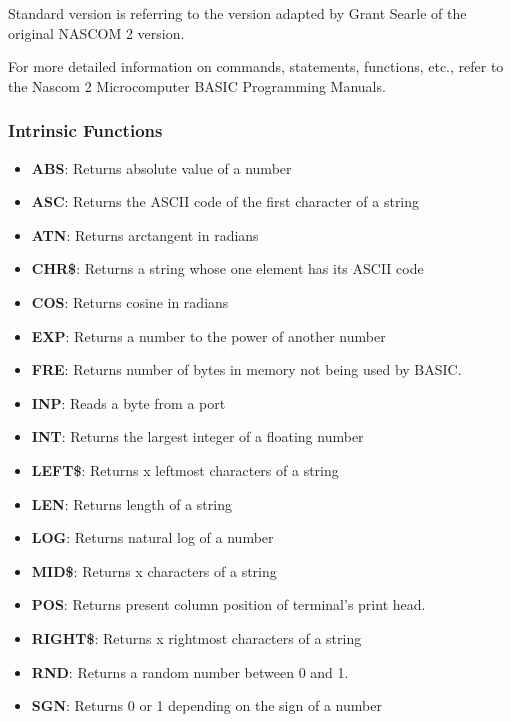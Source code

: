 \documentclass[a4paper,11pt]{article}
\begin{document}
    Standard version is referring to the version adapted by Grant Searle
    \cite{searle1} of the original NASCOM 2 version.

    For more detailed information on commands, statements, functions, etc.,
    refer to the Nascom 2 Microcomputer BASIC Programming Manuals\cite{nascombasic}.

    \subsubsection{Intrinsic Functions}

    \begin{itemize}
        \item \textbf{ABS}: Returns absolute value of a number
        \item \textbf{ASC}: Returns the ASCII code of the first character of a string
        \item \textbf{ATN}: Returns arctangent in radians
        \item \textbf{CHR\$}: Returns a string whose one element has its ASCII code
        \item \textbf{COS}: Returns cosine in radians
        \item \textbf{EXP}: Returns a number to the power of another number
        \item \textbf{FRE}: Returns number of bytes in memory not being used by BASIC.
        \item \textbf{INP}: Reads a byte from a port
        \item \textbf{INT}: Returns the largest integer of a floating number
        \item \textbf{LEFT\$}: Returns x leftmost characters of a string
        \item \textbf{LEN}: Returns length of a string
        \item \textbf{LOG}: Returns natural log of a number
        \item \textbf{MID\$}: Returns x characters of a string
        \item \textbf{POS}: Returns present column position of terminal's print head.
        \item \textbf{RIGHT\$}: Returns x rightmost characters of a string
        \item \textbf{RND}: Returns a random number between 0 and 1.
        \item \textbf{SGN}: Returns 0 or 1 depending on the sign of a number

\end{itemize}
\end{document}
